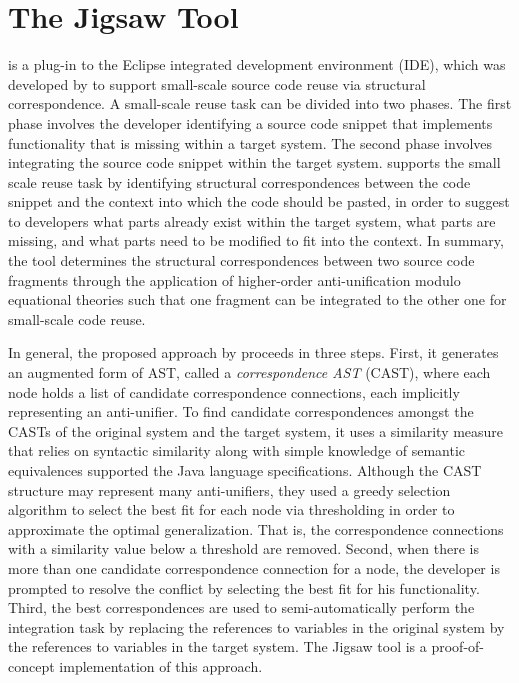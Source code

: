 \section{The Jigsaw Tool}\label{Jigsaw}

 is a plug-in to the Eclipse integrated development environment (IDE), which was developed by \citet{2008:fse:cottrell} to support small-scale source code reuse via structural correspondence. A small-scale reuse task can be divided into two phases. The first phase involves the developer identifying a source code snippet that implements functionality that is missing within a target system. The second phase involves integrating the source code snippet within the target system.
 supports the small scale reuse task by identifying structural correspondences between the code snippet and the context into which the code should be pasted, in order to suggest to developers what parts already exist within the target system, what parts are missing, and what parts need to be modified to fit into the context. In summary, the  tool determines the structural correspondences between two  source code fragments through the application of higher-order anti-unification modulo equational theories such that one fragment can be integrated to the other one for small-scale code reuse.


In general, the proposed approach by \citeauthor{2008:fse:cottrell} proceeds in three steps. First, it generates an augmented form of AST, called a \emph{correspondence AST} (CAST), where each node holds a list of candidate correspondence connections, each implicitly representing an anti-unifier. To find candidate correspondences amongst the CASTs of the original system and the target system, it uses a similarity measure that relies on syntactic similarity along with simple knowledge of semantic equivalences supported the Java language specifications. Although the CAST structure may represent many anti-unifiers, they used a greedy selection algorithm to select the best fit for each node via thresholding in order to approximate the optimal generalization. That is, the correspondence connections with a similarity value below a threshold are removed. Second, when there is more than one candidate correspondence connection for a node, the developer is prompted to resolve the conflict by selecting the best fit for his functionality. Third, the best correspondences are used to semi-automatically perform the integration task by replacing the references to variables in the original system by the references to variables in the target system. The Jigsaw tool is a proof-of-concept implementation of this approach.

